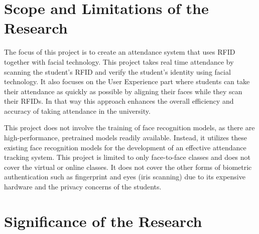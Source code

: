 	\section{Scope and Limitations of the Research}
\label{sec:scopelimitations}

The focus of this project is to create an attendance system that uses RFID together with facial technology. This project takes real time attendance by scanning the student's RFID and verify the student's identity using facial technology. It also focuses on the User Experience part where students can take their attendance as quickly as possible by aligning their faces while they scan their RFIDs. In that way this approach enhances the overall efficiency and accuracy of taking attendance in the university.

This project does not involve the training of face recognition models, as there are high-performance, pretrained models readily available. Instead, it utilizes these existing face recognition models for the development of an effective attendance tracking system. This project is limited to only face-to-face classes and does not cover the virtual or online classes. It does not cover the other forms of biometric authentication such as fingerprint and eyes (iris scanning) due to its expensive hardware and the privacy concerns of the students.


\begin{comment}
	This section discusses the boundaries (with respect to the objectives) of the research and the constraints within 
	which the research will be developed.
\end{comment}

\begin{comment}

%
%
Generally, one paragraph should be allotted for each of your research objectives.

Each paragraph contains a brief overview of the concept/theory and the purpose of doing the associated objective.

Each paragraph also includes a description of the scope/limitation of your study.

* Please refer to the slides for examples.

\end{comment}


\section{Significance of the Research}
\label{sec:significance}

